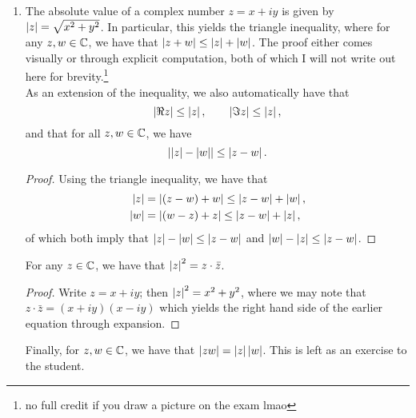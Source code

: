 \begin{enumerate}[label=(\alph*)]
    \item The absolute value of a complex number $z = x + iy$ is given by $\left\lvert z \right\rvert = \sqrt{x^2 + y^2}$. In particular, this yields the triangle inequality, where for any $z, w \in \mathbb C$, we have that $\left\lvert z + w \right\rvert \leq \left\lvert z \right\rvert + \left\lvert w \right\rvert$. The proof either comes visually or through explicit computation, both of which I will not write out here for brevity.\footnote{no full credit if you draw a picture on the exam lmao}
    \\[8pt]
    As an extension of the inequality, we also automatically have that
    \[ \left\lvert \Re z \right\rvert \leq \left\lvert z \right\rvert, \qquad \left\lvert \Im z \right\rvert \leq \left\lvert z \right\rvert, \]
    and that for all $z, w \in \mathbb C$, we have
    \[ \left\lvert \left\lvert z \right\rvert - \left\lvert w \right\rvert \right\rvert \leq \left\lvert z - w \right\rvert. \]
    \begin{proof}
        Using the triangle inequality, we have that
        \begin{align*}
            \left\lvert z \right\rvert &= \left\lvert (z-w) + w \right\rvert \leq \left\lvert z - w \right\rvert + \left\lvert w \right\rvert, \\
            \left\lvert w \right\rvert &= \left\lvert (w-z) + z \right\rvert \leq \left\lvert z - w \right\rvert + \left\lvert z \right\rvert,
        \end{align*}
        of which both imply that $\left\lvert z \right\rvert - \left\lvert w \right\rvert \leq \left\lvert z - w \right\rvert$ and $\left\lvert w \right\rvert - \left\lvert z \right\rvert \leq \left\lvert z - w \right\rvert$.
    \end{proof}
    For any $z \in \mathbb C$, we have that $\left\lvert z \right\rvert^2 = z \cdot \bar{z}$.
    \begin{proof}
        Write $z = x + iy$; then $\left\lvert z \right\rvert^2 = x^2 + y^2$, where we may note that $z \cdot \bar{z} = (x + iy)(x - iy)$ which yields the right hand side of the earlier equation through expansion.
    \end{proof}
    Finally, for $z, w \in \mathbb C$, we have that $\left\lvert zw \right\rvert = \left\lvert z \right\rvert \left\lvert w \right\rvert$. This is left as an exercise to the student.


\end{enumerate}
